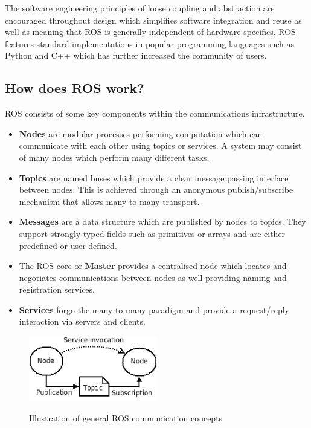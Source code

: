 \documentclass{mproj}
\begin{document}
The software engineering principles of loose coupling and abstraction are encouraged throughout design which simplifies software integration and reuse as well as meaning that ROS is generally independent of hardware specifics. ROS features standard implementations in popular programming languages such as Python and C++ which has further increased the community of users.

\subsection{How does ROS work?}

ROS consists of some key components within the communications infrastructure.
\begin{itemize}
  \item \textbf{Nodes} are modular processes performing computation which can communicate with each other using topics or services. A system may consist of many nodes which perform many different tasks.
  \item \textbf{Topics} are named buses which provide a clear message passing interface between nodes. This is achieved through an anonymous publish/subscribe mechanism that allows many-to-many transport.
  \item \textbf{Messages} are a data structure which are published by nodes to topics. They support strongly typed fields such as primitives or arrays and are either predefined or user-defined.
  \item The ROS core or \textbf{Master} provides a centralised node which locates and negotiates communications between nodes as well providing naming and registration services.
  \item \textbf{Services} forgo the many-to-many paradigm and provide a request/reply interaction via servers and clients.
\end{itemize}

\begin{figure}[h]
  \caption{Illustration of general ROS communication concepts}
  \centering
  \includegraphics[width=0.5\textwidth]{images/ROS_basic_concepts.png}
  \label{fig:ROS diagram}
\end{figure}
\end{document}
